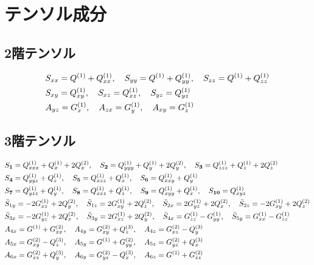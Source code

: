 \documentclass[11pt]{easymemo}
\begin{document}
\newpage
\appendix

\section{テンソル成分}\label{app1}

\subsection{2階テンソル}
\begin{align}
&
S_{xx}=Q^{(1)} + Q^{(1)}_{xx},
\quad
S_{yy}=Q^{(1)} + Q^{(1)}_{yy},
\quad
S_{zz}=Q^{(1)} + Q^{(1)}_{zz}
\cr&
S_{xy}=Q^{(1)}_{xy},
\quad
S_{xz}=Q^{(1)}_{xz},
\quad
S_{yz}=Q^{(1)}_{yz}
\\&
A_{yz}=G^{(1)}_{x},
\quad
A_{zx}=G^{(1)}_{y},
\quad
A_{xy}=G^{(1)}_{z}
\end{align}

\subsection{3階テンソル}
\begin{align}
&
S_{\textbf{1}}=Q^{(1)}_{xxx} + Q^{(1)}_{x} + 2Q^{(2)}_{x},
\quad
S_{\textbf{2}}=Q^{(1)}_{yyy} + Q^{(1)}_{y} + 2Q^{(2)}_{y},
\quad
S_{\textbf{3}}=Q^{(1)}_{zzz} + Q^{(1)}_{z} + 2Q^{(2)}_{z}
\cr&
S_{\textbf{4}}=Q^{(1)}_{yyz} + Q^{(1)}_{z},
\quad
S_{\textbf{5}}=Q^{(1)}_{xzz} + Q^{(1)}_{x},
\quad
S_{\textbf{6}}=Q^{(1)}_{xxy} + Q^{(1)}_{y}
\cr&
S_{\textbf{7}}=Q^{(1)}_{yzz} + Q^{(1)}_{y},
\quad
S_{\textbf{8}}=Q^{(1)}_{xxz} + Q^{(1)}_{z},
\quad
S_{\textbf{9}}=Q^{(1)}_{xyy} + Q^{(1)}_{x},
\quad
S_{\textbf{10}}=Q^{(1)}_{xyz}
\cr&
\bar{S}_{1y}=-2G^{(1)}_{xz} + 2Q^{(2)}_{y},
\quad
\bar{S}_{1z}=2G^{(1)}_{xy} + 2Q^{(2)}_{z},
\quad
\bar{S}_{2x}=2G^{(1)}_{yz} + 2Q^{(2)}_{x},
\quad
\bar{S}_{2z}=-2G^{(1)}_{xy} + 2Q^{(2)}_{z}
\cr&
\bar{S}_{3x}=-2G^{(1)}_{yz} + 2Q^{(2)}_{x},
\quad
\bar{S}_{3y}=2G^{(1)}_{xz} + 2Q^{(2)}_{y},
\quad
\bar{S}_{4x}=G^{(1)}_{zz} - G^{(1)}_{yy},
\quad
\bar{S}_{5y}=G^{(1)}_{xx} - G^{(1)}_{zz}
\\&
A_{4x}=G^{(1)} + G^{(2)}_{xx},
\quad
A_{4y}=G^{(2)}_{xy} + Q^{(3)}_{z},
\quad
A_{4z}=G^{(2)}_{xz} - Q^{(3)}_{y}
\cr&
A_{5x}=G^{(2)}_{xy} - Q^{(3)}_{z},
\quad
A_{5y}=G^{(1)} + G^{(2)}_{yy},
\quad
A_{5z}=G^{(2)}_{yz} + Q^{(3)}_{x}
\cr&
A_{6x}=G^{(2)}_{xz} + Q^{(3)}_{y},
\quad
A_{6y}=G^{(2)}_{yz} - Q^{(3)}_{x},
\quad
A_{6z}=G^{(1)} + G^{(2)}_{zz}
\end{align}
\end{document}
